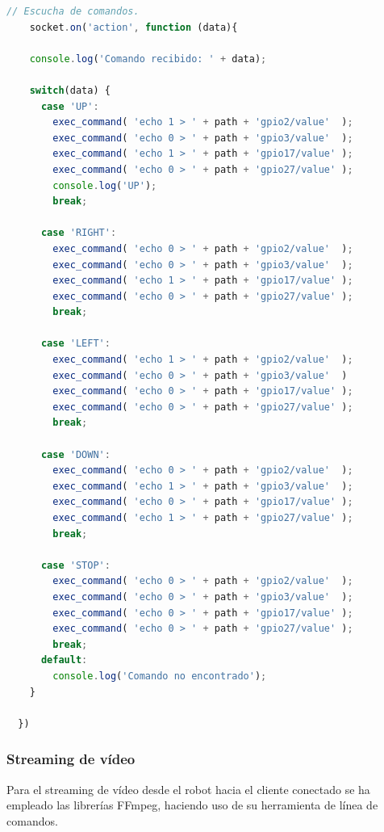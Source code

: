 \begin{lstlisting}[language=JavaScript]
  // Escucha de comandos.
    socket.on('action', function (data){

    console.log('Comando recibido: ' + data);

    switch(data) {
      case 'UP':
        exec_command( 'echo 1 > ' + path + 'gpio2/value'  );
        exec_command( 'echo 0 > ' + path + 'gpio3/value'  );
        exec_command( 'echo 1 > ' + path + 'gpio17/value' );
        exec_command( 'echo 0 > ' + path + 'gpio27/value' );
        console.log('UP');
        break;

      case 'RIGHT':
        exec_command( 'echo 0 > ' + path + 'gpio2/value'  );
        exec_command( 'echo 0 > ' + path + 'gpio3/value'  );
        exec_command( 'echo 1 > ' + path + 'gpio17/value' );
        exec_command( 'echo 0 > ' + path + 'gpio27/value' );
        break;

      case 'LEFT':
        exec_command( 'echo 1 > ' + path + 'gpio2/value'  );
        exec_command( 'echo 0 > ' + path + 'gpio3/value'  )
        exec_command( 'echo 0 > ' + path + 'gpio17/value' );
        exec_command( 'echo 0 > ' + path + 'gpio27/value' );
        break;

      case 'DOWN':
        exec_command( 'echo 0 > ' + path + 'gpio2/value'  );
        exec_command( 'echo 1 > ' + path + 'gpio3/value'  );
        exec_command( 'echo 0 > ' + path + 'gpio17/value' );
        exec_command( 'echo 1 > ' + path + 'gpio27/value' );
        break;

      case 'STOP':
        exec_command( 'echo 0 > ' + path + 'gpio2/value'  );
        exec_command( 'echo 0 > ' + path + 'gpio3/value'  );
        exec_command( 'echo 0 > ' + path + 'gpio17/value' );
        exec_command( 'echo 0 > ' + path + 'gpio27/value' );
        break;
      default:
        console.log('Comando no encontrado');
    }

  })
\end{lstlisting}



\subsubsection{ Streaming de vídeo }



Para el streaming de vídeo desde el robot hacia el cliente conectado se ha empleado las librerías FFmpeg, haciendo uso de su herramienta de línea de comandos.


